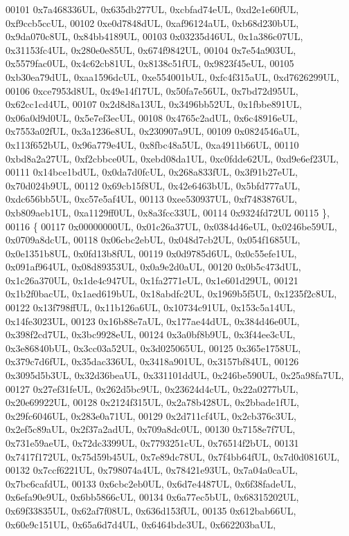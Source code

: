 \begin{DoxyCode}
00101     0x7a468336UL, 0x635db277UL, 0xcbfad74eUL, 0xd2e1e60fUL, 0xf9ccb5ccUL,
00102     0xe0d7848dUL, 0xaf96124aUL, 0xb68d230bUL, 0x9da070c8UL, 0x84bb4189UL,
00103     0x03235d46UL, 0x1a386c07UL, 0x31153fc4UL, 0x280e0e85UL, 0x674f9842UL,
00104     0x7e54a903UL, 0x5579fac0UL, 0x4c62cb81UL, 0x8138c51fUL, 0x9823f45eUL,
00105     0xb30ea79dUL, 0xaa1596dcUL, 0xe554001bUL, 0xfc4f315aUL, 0xd7626299UL,
00106     0xce7953d8UL, 0x49e14f17UL, 0x50fa7e56UL, 0x7bd72d95UL, 0x62cc1cd4UL,
00107     0x2d8d8a13UL, 0x3496bb52UL, 0x1fbbe891UL, 0x06a0d9d0UL, 0x5e7ef3ecUL,
00108     0x4765c2adUL, 0x6c48916eUL, 0x7553a02fUL, 0x3a1236e8UL, 0x230907a9UL,
00109     0x0824546aUL, 0x113f652bUL, 0x96a779e4UL, 0x8fbc48a5UL, 0xa4911b66UL,
00110     0xbd8a2a27UL, 0xf2cbbce0UL, 0xebd08da1UL, 0xc0fdde62UL, 0xd9e6ef23UL,
00111     0x14bce1bdUL, 0x0da7d0fcUL, 0x268a833fUL, 0x3f91b27eUL, 0x70d024b9UL,
00112     0x69cb15f8UL, 0x42e6463bUL, 0x5bfd777aUL, 0xdc656bb5UL, 0xc57e5af4UL,
00113     0xee530937UL, 0xf7483876UL, 0xb809aeb1UL, 0xa1129ff0UL, 0x8a3fcc33UL,
00114     0x9324fd72UL
00115   \},
00116   \{
00117     0x00000000UL, 0x01c26a37UL, 0x0384d46eUL, 0x0246be59UL, 0x0709a8dcUL,
00118     0x06cbc2ebUL, 0x048d7cb2UL, 0x054f1685UL, 0x0e1351b8UL, 0x0fd13b8fUL,
00119     0x0d9785d6UL, 0x0c55efe1UL, 0x091af964UL, 0x08d89353UL, 0x0a9e2d0aUL,
00120     0x0b5c473dUL, 0x1c26a370UL, 0x1de4c947UL, 0x1fa2771eUL, 0x1e601d29UL,
00121     0x1b2f0bacUL, 0x1aed619bUL, 0x18abdfc2UL, 0x1969b5f5UL, 0x1235f2c8UL,
00122     0x13f798ffUL, 0x11b126a6UL, 0x10734c91UL, 0x153c5a14UL, 0x14fe3023UL,
00123     0x16b88e7aUL, 0x177ae44dUL, 0x384d46e0UL, 0x398f2cd7UL, 0x3bc9928eUL,
00124     0x3a0bf8b9UL, 0x3f44ee3cUL, 0x3e86840bUL, 0x3cc03a52UL, 0x3d025065UL,
00125     0x365e1758UL, 0x379c7d6fUL, 0x35dac336UL, 0x3418a901UL, 0x3157bf84UL,
00126     0x3095d5b3UL, 0x32d36beaUL, 0x331101ddUL, 0x246be590UL, 0x25a98fa7UL,
00127     0x27ef31feUL, 0x262d5bc9UL, 0x23624d4cUL, 0x22a0277bUL, 0x20e69922UL,
00128     0x2124f315UL, 0x2a78b428UL, 0x2bbade1fUL, 0x29fc6046UL, 0x283e0a71UL,
00129     0x2d711cf4UL, 0x2cb376c3UL, 0x2ef5c89aUL, 0x2f37a2adUL, 0x709a8dc0UL,
00130     0x7158e7f7UL, 0x731e59aeUL, 0x72dc3399UL, 0x7793251cUL, 0x76514f2bUL,
00131     0x7417f172UL, 0x75d59b45UL, 0x7e89dc78UL, 0x7f4bb64fUL, 0x7d0d0816UL,
00132     0x7ccf6221UL, 0x798074a4UL, 0x78421e93UL, 0x7a04a0caUL, 0x7bc6cafdUL,
00133     0x6cbc2eb0UL, 0x6d7e4487UL, 0x6f38fadeUL, 0x6efa90e9UL, 0x6bb5866cUL,
00134     0x6a77ec5bUL, 0x68315202UL, 0x69f33835UL, 0x62af7f08UL, 0x636d153fUL,
00135     0x612bab66UL, 0x60e9c151UL, 0x65a6d7d4UL, 0x6464bde3UL, 0x662203baUL,

\end{DoxyCode}
